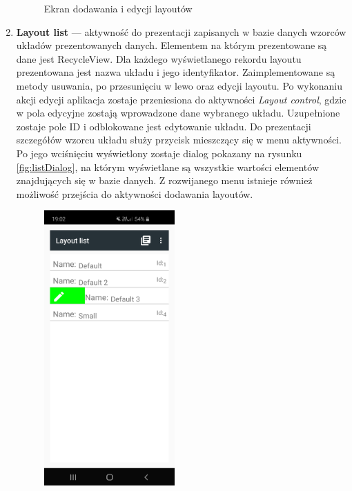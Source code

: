 \documentclass[a4paper,12pt, twoside]{article}
\begin{document}
\begin{enumerate}
\begin{figure}[H]
    			\caption{ Ekran dodawania i edycji layoutów}
                \label{fig:layoutControl}
    	   \end{figure}
           \item \textbf{Layout list} — aktywność do prezentacji zapisanych w bazie danych wzorców układów prezentowanych danych. Elementem na którym prezentowane są dane jest RecycleView. Dla każdego wyświetlanego rekordu layoutu prezentowana jest nazwa układu i jego identyfikator. Zaimplementowane są metody usuwania, po przesunięciu w lewo oraz edycji layoutu. Po wykonaniu akcji edycji aplikacja zostaje przeniesiona do aktywności \textit{Layout control}, gdzie w pola edycyjne zostają wprowadzone dane wybranego układu. Uzupełnione zostaje pole ID i odblokowane jest edytowanie układu. Do prezentacji szczegółów wzorcu układu służy przycisk mieszczący się w menu aktywności. Po jego wciśnięciu wyświetlony zostaje dialog pokazany na rysunku \ref{fig:listDialog}, na którym wyświetlane są wszystkie wartości elementów znajdujących się w bazie danych. Z rozwijanego menu istnieje również możliwość przejścia do aktywności dodawania layoutów.
           \begin{figure}[H]
    	        \centering
    	        \begin{minipage}{.5\textwidth}
                    \centering
    	            \includegraphics[width=5cm]{images/view_layoutList.jpg}
                    \label{fig:datalist}
                \end{minipage}%
    	        \begin{minipage}{.5\textwidth}

\end{minipage}
\end{figure}
\end{enumerate}
\end{document}
